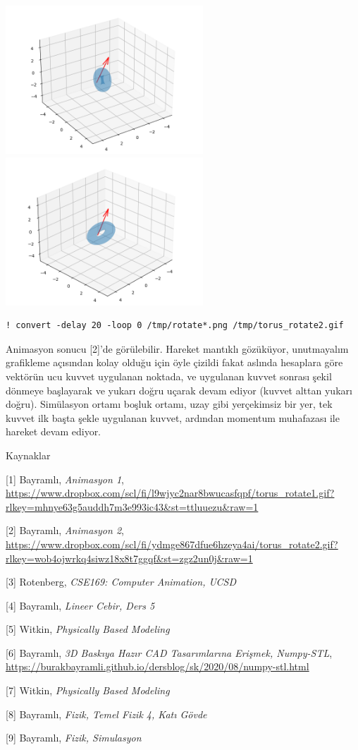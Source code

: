 \documentclass[12pt,fleqn]{article}\usepackage{../../common}
\begin{document}
\includegraphics[width=20em]{sim2/rotate_12.png}
\includegraphics[width=20em]{sim2/rotate_18.png}


\begin{verbatim}
! convert -delay 20 -loop 0 /tmp/rotate*.png /tmp/torus_rotate2.gif
\end{verbatim}

Animasyon sonucu [2]'de görülebilir. Hareket mantıklı gözüküyor, unutmayalım
grafikleme açısından kolay olduğu için öyle çizildi fakat aslında hesaplara göre
vektörün ucu kuvvet uygulanan noktada, ve uygulanan kuvvet sonrası şekil dönmeye
başlayarak ve yukarı doğru uçarak devam ediyor (kuvvet alttan yukarı doğru).
Simülasyon ortamı boşluk ortamı, uzay gibi yerçekimsiz bir yer, tek kuvvet ilk
başta şekle uygulanan kuvvet, ardından momentum muhafazası ile hareket devam
ediyor.


Kaynaklar

[1] Bayramlı, {\em Animasyon 1},
    \url{https://www.dropbox.com/scl/fi/l9wjyc2nar8bwucasfqpf/torus_rotate1.gif?rlkey=mhnye63g5auddh7m3e993ic43&st=ttluuezu&raw=1}

[2] Bayramlı, {\em Animasyon 2},
    \url{https://www.dropbox.com/scl/fi/ydmge867dfue6hzeya4ai/torus_rotate2.gif?rlkey=wob4ojwrkq4siwz18x8t7ggqf&st=zgz2un0j&raw=1}

[3] Rotenberg, {\em CSE169: Computer Animation, UCSD}

[4] Bayramlı, {\em Lineer Cebir, Ders 5}

[5] Witkin, {\em Physically Based Modeling}

[6] Bayramlı, {\em 3D Baskıya Hazır CAD Tasarımlarına Erişmek, Numpy-STL},
    \url{https://burakbayramli.github.io/dersblog/sk/2020/08/numpy-stl.html}

[7] Witkin, {\em Physically Based Modeling}

[8] Bayramlı, {\em Fizik, Temel Fizik 4, Katı Gövde}

[9] Bayramlı, {\em Fizik, Simulasyon}
\end{document}
